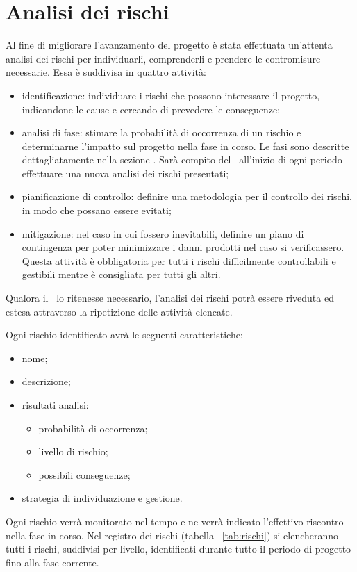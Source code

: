 \documentclass[../PianoProgetto.tex]{subfiles}
\begin{document}
\section{Analisi dei rischi}

	Al fine di migliorare l'avanzamento del progetto è stata effettuata un'attenta analisi dei rischi per individuarli, comprenderli e prendere le contromisure necessarie. Essa è suddivisa in quattro attività:
	\begin{itemize}
	\item identificazione: individuare i rischi che possono interessare il progetto, indicandone le cause e cercando di prevedere le conseguenze;
	\item analisi di fase: stimare la probabilità di occorrenza di un rischio e determinarne l'impatto sul progetto nella fase in corso. Le fasi sono descritte dettagliatamente nella sezione . Sarà compito del \responsabilediprogetto\  all'inizio di ogni periodo effettuare una nuova analisi dei rischi presentati;
	\item pianificazione di controllo: definire una metodologia per il controllo dei rischi, in modo che possano essere evitati;
	\item mitigazione: nel caso in cui fossero inevitabili, definire un piano di contingenza per poter minimizzare i danni prodotti nel caso si verificassero. Questa attività è obbligatoria per tutti i rischi difficilmente controllabili e gestibili mentre è consigliata per tutti gli altri.
	\end{itemize}
    Qualora il \responsabilediprogetto\ lo ritenesse necessario, l'analisi dei rischi potrà essere riveduta ed estesa attraverso la ripetizione delle attività elencate.

	Ogni rischio identificato avrà le seguenti caratteristiche: 
		\begin{itemize}
			\item nome;
			\item descrizione; 
			\item risultati analisi:
			\begin{itemize}
				\item probabilità di occorrenza;
				\item livello di rischio;
				\item possibili conseguenze;
			\end{itemize}
			\item strategia di individuazione e gestione.
		\end{itemize}	
	Ogni rischio verrà monitorato nel tempo e ne verrà indicato l'effettivo riscontro nella fase in corso.
    Nel registro dei rischi (tabella ~\ref{tab:rischi}) si elencheranno tutti i rischi, suddivisi per livello, identificati durante tutto il periodo di progetto fino alla fase corrente.
		
\end{document}
